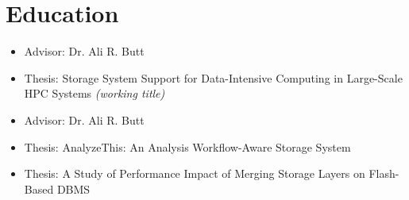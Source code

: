 \section{Education}

\begin{itemize}
\item {\small Advisor: Dr. Ali R. Butt}
\item {\small Thesis: Storage System Support for Data-Intensive Computing in Large-Scale HPC Systems
            {\footnotesize{\it(working title)}}}
\end{itemize}

\begin{itemize}
\item {\small Advisor: Dr. Ali R. Butt}
\item {\small Thesis: AnalyzeThis: An Analysis Workflow-Aware Storage System}
\end{itemize}

\begin{itemize}
\item {\small Thesis: A Study of Performance Impact of Merging Storage Layers on Flash-Based DBMS}
\end{itemize}


